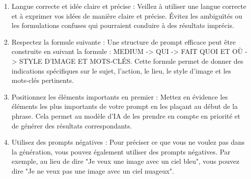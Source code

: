 \documentclass[11,5pt]{report}
\begin{document}
\begin{spacing}{2}
\begin{enumerate}
  \item Langue correcte et idée claire et précise : Veillez à utiliser une langue correcte et à exprimer vos idées de manière claire et précise. Évitez les ambiguïtés ou les formulations confuses qui pourraient conduire à des résultats imprécis.
  
  \item Respectez la formule suivante : Une structure de prompt efficace peut être construite en suivant la formule : MEDIUM -> QUI -> FAIT QUOI ET OÙ -> STYLE D'IMAGE ET MOTS-CLÉS. Cette formule permet de donner des indications spécifiques sur le sujet, l'action, le lieu, le style d'image et les mots-clés pertinents.
  
  \item Positionnez les éléments importants en premier : Mettez en évidence les éléments les plus importants de votre prompt en les plaçant au début de la phrase. Cela permet au modèle d'IA de les prendre en compte en priorité et de générer des résultats correspondants.
  
  \item Utilisez des prompts négatives : Pour préciser ce que vous ne voulez pas dans la génération, vous pouvez également utiliser des prompts négatives. Par exemple, au lieu de dire "Je veux une image avec un ciel bleu", vous pouvez dire "Je ne veux pas une image avec un ciel nuageux".
\end{enumerate}


\end{spacing}
\end{document}

